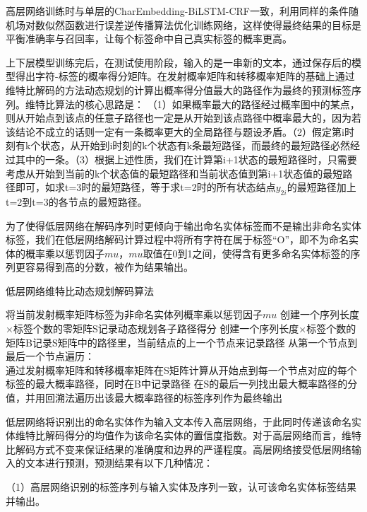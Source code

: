 \documentclass[winfonts,master,oneside,nobackinfo]{njuthesis}
\begin{document}
高层网络训练时与单层的CharEmbedding-BiLSTM-CRF一致，利用同样的条件随机场对数似然函数进行误差逆传播算法优化训练网络，这样使得最终结果的目标是平衡准确率与召回率，让每个标签命中自己真实标签的概率更高。

上下层模型训练完后，在测试使用阶段，输入的是一串新的文本，通过保存后的模型得出字符-标签的概率得分矩阵。在发射概率矩阵和转移概率矩阵的基础上通过维特比解码的方法动态规划的计算出概率得分值最大的路径作为最终的预测标签序列。维特比算法的核心思路是： （1）如果概率最大的路径经过概率图中的某点，则从开始点到该点的任意子路径也一定是从开始到该点路径中概率最大的，因为若该结论不成立的话则一定有一条概率更大的全局路径与题设矛盾。（2）假定第i时刻有k个状态，从开始到i时刻的k个状态有k条最短路径，而最终的最短路径必然经过其中的一条。（3）根据上述性质，我们在计算第i+1状态的最短路径时，只需要考虑从开始到当前的k个状态值的最短路径和当前状态值到第i+1状态值的最短路径即可，如求t=3时的最短路径，等于求t=2时的所有状态结点$y_{2i}$的最短路径加上t=2到t=3的各节点的最短路径。


为了使得低层网络在解码序列时更倾向于输出命名实体标签而不是输出非命名实体标签，我们在低层网络解码计算过程中将所有字符在属于标签“O”，即不为命名实体的概率乘以惩罚因子$mu$，$mu$取值在0到1之间，使得含有更多命名实体标签的序列更容易得到高的分数，被作为结果输出。

\begin{algorithm}[H]
    \caption{低层网络维特比动态规划解码算法}
    \label{alg1}
    \begin{algorithmic}[1]
		\STATE 将当前发射概率矩阵标签为非命名实体列概率乘以惩罚因子$mu$
        \STATE 创建一个序列长度×标签个数的零矩阵S记录动态规划各子路径得分
        \STATE 创建一个序列长度×标签个数的矩阵B记录S矩阵中的路径里，当前结点的上一个节点来记录路径
        \STATE 从第一个节点到最后一个节点遍历： \\
		通过发射概率矩阵和转移概率矩阵在S矩阵计算从开始点到每一个节点对应的每个标签的最大概率路径，同时在B中记录路径
		\STATE 在S的最后一列找出最大概率路径的分值，并用回溯法遍历出该最大概率路径的标签序列作为最终输出
    \end{algorithmic}
\end{algorithm}

低层网络将识别出的命名实体作为输入文本传入高层网络，于此同时传递该命名实体维特比解码得分的均值作为该命名实体的置信度指数。对于高层网络而言，维特比解码方式不变来保证结果的准确度和边界的严谨程度。高层网络接受低层网络输入的文本进行预测，预测结果有以下几种情况：

（1）高层网络识别的标签序列与输入实体及序列一致，认可该命名实体标签结果并输出。
\end{document}
